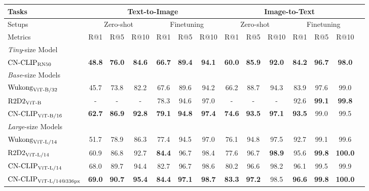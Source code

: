\documentclass[11pt]{article}
\begin{document}
\begin{table*}[t]
\center
\small
\vskip 0.15in
\begin{adjustbox}{max width=1.\textwidth}
\begin{tabular}{@{\extracolsep{\fill}}lccccccccccccc}
\toprule
  Tasks
  &\multicolumn{6}{c}{Text-to-Image}
  &\multicolumn{6}{c}{Image-to-Text}
  \\
\midrule
  Setups
  &\multicolumn{3}{c}{Zero-shot}
  &\multicolumn{3}{c}{Finetuning}
  &\multicolumn{3}{c}{Zero-shot}
  &\multicolumn{3}{c}{Finetuning}
  \\
\midrule
  Metrics & R@1 & R@5 & R@10 & R@1 & R@5 & R@10 & R@1 & R@5 & R@10 & R@1 & R@5 & R@10
  \\
\midrule
    \multicolumn{13}{l}{\textit{Tiny}-size Model} \\
    $\text{CN-CLIP}\rm_{RN50}$
    & \textbf{48.8}	& \textbf{76.0}	& \textbf{84.6}	& \textbf{66.7} & \textbf{89.4} & \textbf{94.1} & \textbf{60.0}	& \textbf{85.9}	& \textbf{92.0}	& \textbf{84.2}	& \textbf{96.7}	& \textbf{98.0}
    \\
\midrule
    \multicolumn{13}{l}{\textit{Base}-size Models} \\
    $\text{Wukong}\rm_{ViT\text{-}B/32}$
    & 45.7	& 73.8	& 82.2	& 67.6	& 89.6	& 94.2	& 66.2	& 88.7	& 94.3	& 83.9	& 97.6	& 99.0
    \\
    $\text{R2D2}\rm_{ViT\text{-}B}$
    & -	& -	& -	& 78.3	& 94.6	& 97.0	& -	& -	& -	& 92.6	& \textbf{99.1}	& \textbf{99.8}
    \\
    $\text{CN-CLIP}\rm_{ViT\text{-}B/16}$
    & \textbf{62.7}	& \textbf{86.9}	& \textbf{92.8}	& \textbf{79.1}	& \textbf{94.8}	& \textbf{97.4}	& \textbf{74.6}	& \textbf{93.5}	& \textbf{97.1}	& \textbf{93.5}	& 99.0	& 99.5
    \\
\midrule
    \multicolumn{9}{l}{\textit{Large}-size Models} \\
    $\text{Wukong}\rm_{ViT\text{-}L/14}$
    & 51.7	& 78.9	& 86.3	& 77.4 	& 94.5 	& 97.0	& 76.1	& 94.8	& 97.5	& 92.7 	& 99.1 	& 99.6
    \\
    $\text{R2D2}\rm_{ViT\text{-}L/14}$
    & 60.9	& 86.8	& 92.7	& \textbf{84.4} 	& 96.7 	& 98.4	& 77.6	& 96.7	& \textbf{98.9}	& 95.6 	& \textbf{99.8}	& \textbf{100.0}
    \\
    $\text{CN-CLIP}\rm_{ViT\text{-}L/14}$
    & 68.0	& 89.7	& 94.4	& 82.7	& 96.7	& 98.6	& 80.2	& 96.6	& 98.2	& 96.1	& 99.5	& 99.9
    \\
    $\text{CN-CLIP}\rm_{ViT\text{-}L/14@336px}$
    & \textbf{69.0}	& \textbf{90.7}	& \textbf{95.4}	& \textbf{84.4}	& \textbf{97.1}	& \textbf{98.7}	& \textbf{83.3}	& \textbf{97.2}	& 98.5	& \textbf{96.6}	& \textbf{99.8}	& \textbf{100.0}

\end{tabular}
\end{adjustbox}
\end{table*}
\end{document}
